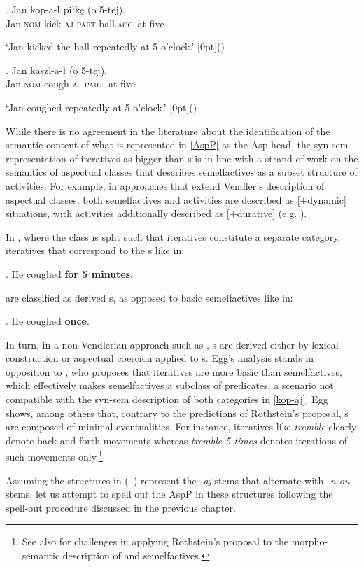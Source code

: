 \exg. Jan kop-{a}-\l {} pi\l k\k{e} ({o 5-tej)}. \\
	Jan.\textsc{nom} kick-\textsc{aj-part} ball.\textsc{acc} { \,at five}\\
	\strut `Jan kicked the ball repeatedly at 5 o'clock.' \hfill\raisebox{2.075\baselineskip}[0pt]{()}
	
\exg.	Jan kaszl-a-\l  {} ({o 5-tej)}.  \\
	Jan.\textsc{nom} cough-\textsc{aj-part} { \,at five}\\
	\strut `Jan coughed repeatedly at 5 o'clock.' \hfill\raisebox{2.075\baselineskip}[0pt]{()}

\noindent
While there is no agreement in the literature about the identification of the semantic content of what is represented in \ref{AspP} as the Asp head, the syn-sem representation of iteratives as bigger than s is in line with a strand of work on the semantics of aspectual classes that describes semelfactives as a subset structure of  activities. For example, in approaches that extend Vendler's \citeyearpar{Vendler1967} description of aspectual classes, both semelfactives and activities are described as [$+$dynamic] situations, with activities additionally described as [$+$durative] (e.g. \citealt{Smith1997,Olsen1994,Olsen1997,Beavers2008}). 
\par
In \cite{XM2004}, where the  class is split such that iteratives constitute a separate category, iteratives that correspond to the  s like in:

\ex. He coughed \textbf{for 5 minutes}.

are classified as derived s, as opposed to basic semelfactives like in:

\ex. He coughed \textbf{once}.

In turn, in a non-Vendlerian approach such as \cite{Egg2017}, s are derived either by lexical construction or aspectual coercion applied to s. Egg's \citeyearpar{Egg2017} analysis stands in opposition to \cite{rothstein2004}, who proposes that iteratives are more basic than semelfactives, which effectively makes semelfactives a subclass of  predicates, a scenario not compatible with the syn-sem description of both categories in \ref{kop-aj}. Egg shows, among others that, contrary to the predictions of Rothstein's proposal, s are composed of minimal eventualities. For instance, iteratives like \textit{tremble} clearly denote back and forth movements whereas \textit{tremble 5 times} denotes iterations of such movements only.\footnote{See also \citet[\S4.1]{NU} for challenges in applying Rothstein's proposal to the morpho-semantic description of  and  semelfactives.
}%
\par Assuming the structures in (--) represent the  \textit{-aj} stems that alternate with \textit{-n-ou} stems, let us attempt to spell out the AspP in these structures following the spell-out procedure discussed in the previous chapter.

